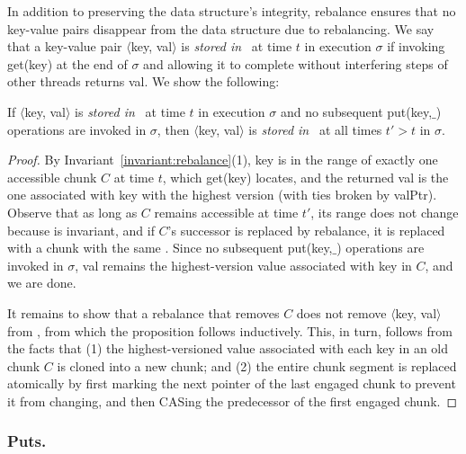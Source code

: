 In addition to preserving the data structure's integrity, rebalance ensures that no key-value pairs disappear from the data structure due to rebalancing. 
We say that a key-value pair $\langle$key, val$ \rangle$ is \emph{stored in} \kiwi\ at time $t$ in execution $\sigma$ if invoking get(key) at the end of $\sigma$
and allowing it to complete without interfering steps of other threads returns val. We show the following:

\begin{proposition}
If $\langle$key, val$ \rangle$ is \emph{stored in} \kiwi\ at time $t$ in execution $\sigma$ and no subsequent put(key,$\_$)  operations are invoked in $\sigma$, 
then $\langle$key, val$ \rangle$ is \emph{stored in} \kiwi\ at all times $t' > t$ in  $\sigma$.
\label{proposition:no-loss}
\end{proposition}
\begin{proof}
By Invariant~\ref{invariant:rebalance}(1), key is in the range of exactly one accessible chunk $C$ at time $t$,  which  get(key) locates, 
and the returned val is the one associated with key with the highest version (with ties broken by valPtr). 
Observe that as long as $C$ remains accessible at time $t'$, its range does not change because  is invariant, and if $C$'s successor is 
replaced by rebalance, it is replaced with a chunk with the same . 
Since no   subsequent put(key,$\_$)  operations are invoked in $\sigma$, val remains the highest-version value associated with key in $C$, and we are done.

It remains to show that a rebalance that removes $C$ does not remove $\langle$key, val$ \rangle$ from \kiwi, from which the proposition follows   inductively.
This, in turn, follows from the facts that (1) the highest-versioned value associated with each key in an old chunk $C$ is cloned into a new chunk; and 
(2) the entire chunk segment is replaced atomically by first marking the next pointer of the last engaged chunk to prevent it from changing, and then 
CASing the predecessor of the first engaged chunk.
 \end{proof}

\subsubsection{Puts.} 
\label{ssec:put-proof}

